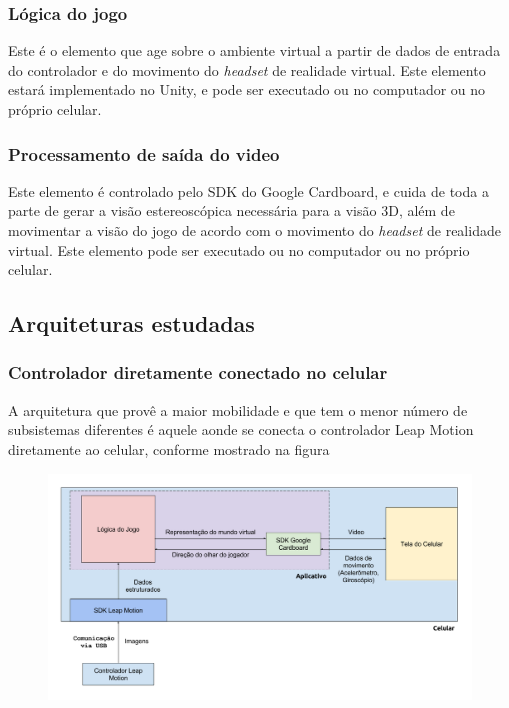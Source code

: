 \subsubsection{Lógica do jogo}\label{subsubsec-elemento-logica-jogo}

Este é o elemento que age sobre o ambiente virtual a partir de dados de entrada do controlador e do movimento do \textit{headset} de realidade virtual. Este elemento estará implementado no Unity, e pode ser executado ou no computador ou no próprio celular.

\subsubsection{Processamento de saída do video}\label{subsubsec-elemento-video}

Este elemento é controlado pelo SDK do Google Cardboard, e cuida de toda a parte de gerar a visão estereoscópica necessária para a visão 3D, além de movimentar a visão do jogo de acordo com o movimento do \textit{headset} de realidade virtual. Este elemento pode ser executado ou no computador ou no próprio celular.

\subsection{Arquiteturas estudadas}\label{subsec-arquiteturas-estudadas}

\subsubsection{Controlador diretamente conectado no celular}\label{subsubsec-arquiteturas-leapmotion-android}

A arquitetura que provê a maior mobilidade e que tem o menor número de subsistemas diferentes é aquele aonde se conecta o controlador Leap Motion diretamente ao celular, conforme mostrado na figura %

\begin{figure}
	\centering
	\includegraphics[width=0.7\linewidth]{images/Arquitetura-leap-android}
	\caption{}
	\label{fig:arquitetura-leap-android}
\end{figure}

